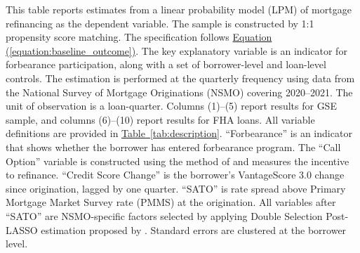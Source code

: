 \documentclass[11pt]{article}
\begin{document}
{\begin{table}[htbp]
\begin{minipage}{\textwidth}
\small
This table reports estimates from a linear probability model (LPM) of mortgage refinancing as the dependent variable. The sample is constructed by 1:1 propensity score matching.  The specification follows \hyperref[equation:baseline_outcome]{Equation (\ref*{equation:baseline_outcome})}. The key explanatory variable is an indicator for forbearance participation, along with a set of borrower-level and loan-level controls. The estimation is performed at the quarterly frequency using data from the National Survey of Mortgage Originations (NSMO) covering 2020–2021. The unit of observation is a loan-quarter. Columns (1)–(5) report results for GSE sample, and columns (6)–(10) report results for FHA loans. All variable definitions are provided in \hyperref[tab:description]{Table~\ref*{tab:description}}. ``Forbearance'' is an indicator that shows whether the borrower has entered forbearance program. The ``Call Option'' variable is constructed using the method of \citet{deng2000mortgage} and measures the incentive to refinance. ``Credit Score Change'' is the borrower’s VantageScore 3.0 change since origination, lagged by one quarter. ``SATO'' is rate spread above Primary Mortgage Market Survey rate (PMMS) at the origination. All variables after ``SATO'' are NSMO-specific factors selected by applying Double Selection Post-LASSO estimation proposed by \citet{belloni2014inference}. Standard errors are clustered at the borrower level. 

\end{minipage}

\vspace{1em}




\end{table}
\FloatBarrier
\clearpage


}
\end{document}
